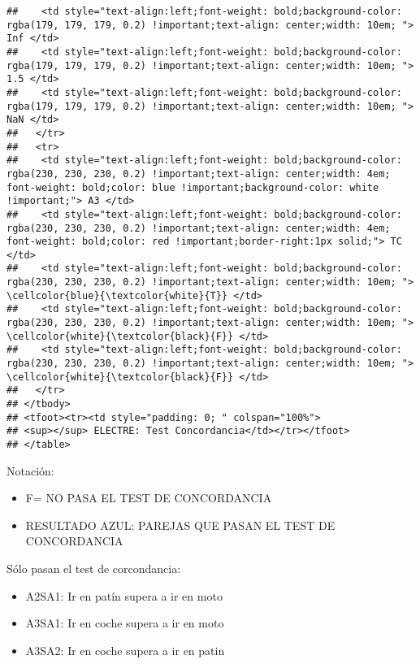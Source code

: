 \documentclass[
]{article}
\providecommand{\tightlist}{%
  \setlength{\itemsep}{0pt}\setlength{\parskip}{0pt}}
\begin{document}
\begin{verbatim}
##    <td style="text-align:left;font-weight: bold;background-color: rgba(179, 179, 179, 0.2) !important;text-align: center;width: 10em; "> Inf </td>
##    <td style="text-align:left;font-weight: bold;background-color: rgba(179, 179, 179, 0.2) !important;text-align: center;width: 10em; "> 1.5 </td>
##    <td style="text-align:left;font-weight: bold;background-color: rgba(179, 179, 179, 0.2) !important;text-align: center;width: 10em; "> NaN </td>
##   </tr>
##   <tr>
##    <td style="text-align:left;font-weight: bold;background-color: rgba(230, 230, 230, 0.2) !important;text-align: center;width: 4em; font-weight: bold;color: blue !important;background-color: white !important;"> A3 </td>
##    <td style="text-align:left;font-weight: bold;background-color: rgba(230, 230, 230, 0.2) !important;text-align: center;width: 4em; font-weight: bold;color: red !important;border-right:1px solid;"> TC </td>
##    <td style="text-align:left;font-weight: bold;background-color: rgba(230, 230, 230, 0.2) !important;text-align: center;width: 10em; "> \cellcolor{blue}{\textcolor{white}{T}} </td>
##    <td style="text-align:left;font-weight: bold;background-color: rgba(230, 230, 230, 0.2) !important;text-align: center;width: 10em; "> \cellcolor{white}{\textcolor{black}{F}} </td>
##    <td style="text-align:left;font-weight: bold;background-color: rgba(230, 230, 230, 0.2) !important;text-align: center;width: 10em; "> \cellcolor{white}{\textcolor{black}{F}} </td>
##   </tr>
## </tbody>
## <tfoot><tr><td style="padding: 0; " colspan="100%">
## <sup></sup> ELECTRE: Test Concordancia</td></tr></tfoot>
## </table>
\end{verbatim}

Notación:

\begin{itemize}
\tightlist
\item
  F= NO PASA EL TEST DE CONCORDANCIA
\item
  RESULTADO AZUL: PAREJAS QUE PASAN EL TEST DE CONCORDANCIA
\end{itemize}

Sólo pasan el test de corcondancia:

\begin{itemize}
\tightlist
\item
  A2SA1: Ir en patín supera a ir en moto
\item
  A3SA1: Ir en coche supera a ir en moto
\item
  A3SA2: Ir en coche supera a ir en patin
\end{itemize}
\end{document}
